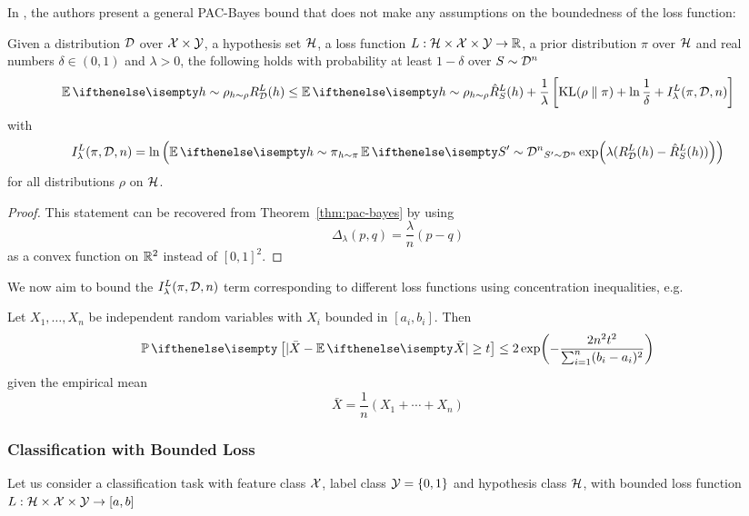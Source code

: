In \cite{alquier2016properties}, the authors present a general PAC-Bayes bound
that does not make any assumptions on the boundedness of the loss function:
\begin{theorem}
  Given a distribution $\mathcal{D}$ over $\mathcal{X} \times \mathcal{Y}$, a hypothesis set $\mathcal{H}$, a
  loss function $L : \mathcal{H} \times \mathcal{X} \times \mathcal{Y} \to \mathbb{R}$, a prior distribution
  $\pi$ over $\mathcal{H}$ and real numbers $\delta \in (0, 1)$ and $\lambda > 0$, the
  following holds with probability at least $1 - \delta$ over $S \sim \mathcal{D}^n$
  \begin{equation}
    \label{eq:alquier-bound}
    \Ev[h \sim \rho]{R_\CD^L(h)} \leq \Ev[h \sim \rho]{\hat{R}_S^L(h)} +
    \frac{1}{\lambda}\left[\KL{\rho}{\pi} + \ln \frac{1}{\delta} +
    I_\lambda^L(\pi, \CD, n)\right]
  \end{equation}
  with
  \begin{equation}
    I_\lambda^L(\pi, \CD, n) = \ln\left(\Ev[h \sim \pi]{\Ev[S' \sim
    \CD^n]{\exp(\lambda(R_\CD^L(h) - \hat{R}_S^L(h)))}}\right)
  \end{equation}
  for all distributions $\rho$ on $\mathcal{H}$.
\end{theorem}

\begin{proof}
  This statement can be recovered from Theorem~\ref{thm:pac-bayes} by using
  \begin{equation}
    \Delta_\lambda(p, q) = \frac{\lambda}{n} (p - q)
  \end{equation}
  as a convex function on $\mathbb{R}^2$ instead of $[0, 1]^2$.
\end{proof}

We now aim to bound the $I_\lambda^L(\pi, \mathcal{D}, n)$ term corresponding to
different loss functions using concentration inequalities, e.g.\:

\begin{lemma}
  Let $X_1, \ldots, X_n$ be independent random variables with $X_i$ bounded in
  $[a_i, b_i]$. Then
  \begin{equation}
    \Pr{| \bar{X} - \Ev{\bar{X}} | \geq t} \leq 2 \exp(- \frac{2 n^2
    t^2}{\sum_{i = 1}^n (b_i - a_i)^2})
  \end{equation}
  given the empirical mean
  \begin{equation}
    \bar{X} = \frac{1}{n}(X_1 + \cdots + X_n)
  \end{equation}
\end{lemma}

\subsubsection{Classification with Bounded Loss}

Let us consider a classification task with feature class $\mathcal{X}$, label class $\mathcal{Y}
= \{0, 1\}$ and hypothesis class $\mathcal{H}$, with bounded loss function $L : \mathcal{H}
\times \mathcal{X} \times \mathcal{Y} \to [a, b]$
